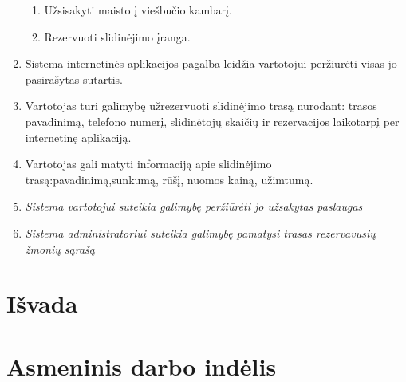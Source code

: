 \documentclass[oneside]{VUMIFPSkursinis}
\begin{document}
\begin{enumerate}
	\begin{enumerate}
		\item Užsisakyti maisto į viešbučio kambarį.
		\item Rezervuoti slidinėjimo įranga.
	\end{enumerate}
	\item Sistema internetinės aplikacijos pagalba leidžia vartotojui peržiūrėti visas jo pasirašytas sutartis.
	\item Vartotojas turi galimybę užrezervuoti slidinėjimo trasą nurodant: trasos pavadinimą, telefono numerį, slidinėtojų skaičių ir rezervacijos laikotarpį per internetinę aplikaciją.
	\item Vartotojas gali matyti informaciją apie slidinėjimo trasą:pavadinimą,sunkumą, rūšį, nuomos kainą, užimtumą.
	\item \textit{Sistema vartotojui suteikia galimybę peržiūrėti jo užsakytas paslaugas}
	\item \textit{Sistema administratoriui suteikia galimybę pamatysi trasas rezervavusių žmonių sąrašą}
\end{enumerate}

\section{Išvada}

\section{Asmeninis darbo indėlis}
\end{document}
